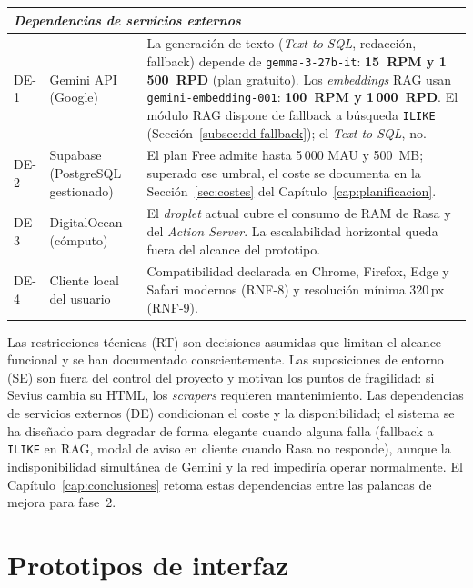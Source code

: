 \begin{table}[hbtp]
\begin{tabular}{|p{1.2cm}|p{3.6cm}|p{8.0cm}|}
\multicolumn{3}{|l|}{\textit{Dependencias de servicios externos}} \\ \hline
DE-1 & Gemini API (Google) & La generación de texto (\textit{Text-to-SQL}, redacción, fallback) depende de \texttt{gemma-3-27b-it}: \textbf{15~RPM y 1\,500~RPD} (plan gratuito). Los \textit{embeddings} RAG usan \texttt{gemini-embedding-001}: \textbf{100~RPM y 1\,000~RPD}. El m\'odulo RAG dispone de fallback a b\'usqueda \texttt{ILIKE} (Secci\'on~\ref{subsec:dd-fallback}); el \textit{Text-to-SQL}, no. \\ \hline
DE-2 & Supabase (PostgreSQL gestionado) & El plan Free admite hasta 5\,000 MAU y 500~MB; superado ese umbral, el coste se documenta en la Sección~\ref{sec:costes} del Capítulo~\ref{cap:planificacion}. \\ \hline
DE-3 & DigitalOcean (cómputo) & El \textit{droplet} actual cubre el consumo de RAM de Rasa y del \textit{Action Server}. La escalabilidad horizontal queda fuera del alcance del prototipo. \\ \hline
DE-4 & Cliente local del usuario & Compatibilidad declarada en Chrome, Firefox, Edge y Safari modernos (RNF-8) y resolución mínima 320\,px (RNF-9). \\ \hline
\end{tabular}
\end{table}

Las restricciones técnicas (RT) son decisiones asumidas que limitan el alcance funcional y se han documentado conscientemente. Las suposiciones de entorno (SE) son fuera del control del proyecto y motivan los puntos de fragilidad: si Sevius cambia su HTML, los \textit{scrapers} requieren mantenimiento. Las dependencias de servicios externos (DE) condicionan el coste y la disponibilidad; el sistema se ha diseñado para degradar de forma elegante cuando alguna falla (fallback a \texttt{ILIKE} en RAG, modal de aviso en cliente cuando Rasa no responde), aunque la indisponibilidad simultánea de Gemini y la red impediría operar normalmente. El Capítulo~\ref{cap:conclusiones} retoma estas dependencias entre las palancas de mejora para fase~2.

\section{Prototipos de interfaz}\label{sec:req-prototipos}


